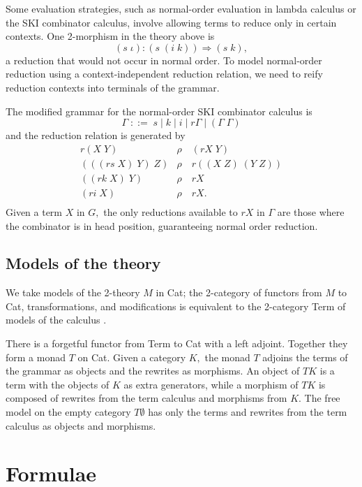 \documentclass[]{acm_proc_article-sp}
\numberwithin{equation}{subsection}
\begin{document}
Some evaluation strategies, such as normal-order evaluation in lambda calculus or the SKI combinator calculus, involve allowing terms to reduce only in certain contexts.  One 2-morphism in the theory above is
\[ (s\; \iota)\colon (s\; (i\; k)) \Rightarrow (s\; k),\]
a reduction that would not occur in normal order.  To model normal-order reduction using a context-independent reduction relation, we need to reify reduction contexts into terminals of the grammar.

The modified grammar for the normal-order SKI combinator calculus is
\[ \Gamma\; ::=\; s\; |\; k\; |\; i\; |\; r\Gamma\; |\; (\Gamma\; \Gamma) \]
and the reduction relation is generated by
\[\begin{array}{rl}
  r(X\; Y)  & \rho\quad (rX\; Y) \\
  (((rs\; X)\; Y)\; Z) & \rho\quad r((X\; Z)\; (Y\; Z))\\
  ((rk\; X)\; Y) & \rho\quad rX\\
  (ri\; X)  & \rho\quad rX.\\
\end{array}\]
Given a term $X$ in $G,$ the only reductions available to $rX$ in $\Gamma$ are those where the combinator is in head position, guaranteeing normal order reduction.

\subsection{Models of the theory}

We take models of the 2-theory $M$ in Cat; the 2-category of functors
from $M$ to Cat, transformations, and modifications is equivalent to
the 2-category Term of models of the calculus \cite{somebody}.

There is a forgetful functor from Term to Cat with a left adjoint.
Together they form a monad $T$ on Cat.  Given a category $K,$ the
monad $T$ adjoins the terms of the grammar as objects and the
rewrites as morphisms.  An object of $TK$ is a term with the objects
of $K$ as extra generators, while a morphism of $TK$ is composed
of rewrites from the term calculus and morphisms from $K$. The
free model on the empty category $T\emptyset$ has only the terms
and rewrites from the term calculus as objects and morphisms.

\section{Formulae}
\end{document}
